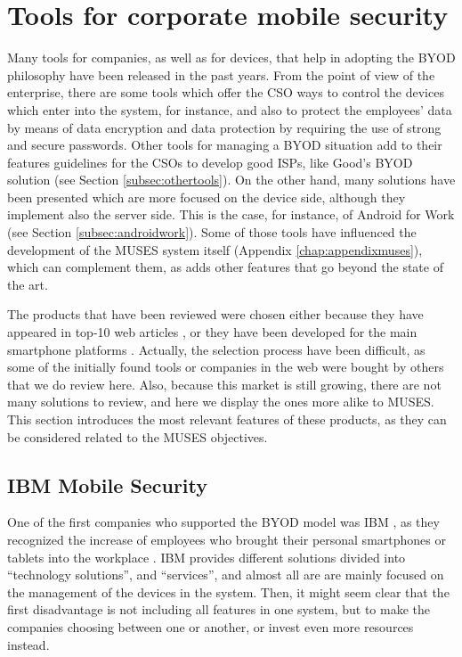 \section{Tools for corporate mobile security}
\label{sec:toolsreview}

Many tools for companies, as well as for devices, that help in adopting the BYOD philosophy have been released in the past years. From the point of view of the enterprise, there are some tools which offer the CSO ways to control the devices which enter into the system, for instance, and also to protect the employees' data by means of data encryption and data protection by requiring the use of strong and secure passwords. Other tools for managing a BYOD situation add to their features guidelines for the CSOs to develop good ISPs, like Good's BYOD solution (see Section \ref{subsec:othertools}). On the other hand, many solutions have been presented which are more focused on the device side, although they implement also the server side. This is the case, for instance, of Android for Work (see Section \ref{subsec:androidwork}). Some of those tools have influenced the development of the MUSES system  itself (Appendix \ref{chap:appendixmuses}), which can complement them, as adds other features that go beyond the state of the art. 

The products that have been reviewed were chosen either because they have appeared in top-10 web articles \cite{thor2013}, or they have been developed for the main smartphone platforms \cite{idc2014}. Actually, the selection process have been difficult, as some of the initially found tools or companies in the web were bought by others that we do review here. Also, because this market is still growing, there are not many solutions to review, and here we display the ones more alike to MUSES. This section introduces the most relevant features of these products, as they can be considered related to the MUSES objectives.



\subsection{IBM Mobile Security}
\label{subsec:ibm}

One of the first companies who supported the BYOD model was IBM \cite{IBM_tool}, as they recognized the increase of employees who brought their personal smartphones or tablets into the workplace \cite{ibm11}. IBM provides different solutions divided into ``technology solutions'', and ``services'', and almost all are are mainly focused on the management of the devices in the system. Then, it might seem clear that the first disadvantage is not including all features in one system, but to make the companies choosing between one or another, or invest even more resources instead.

